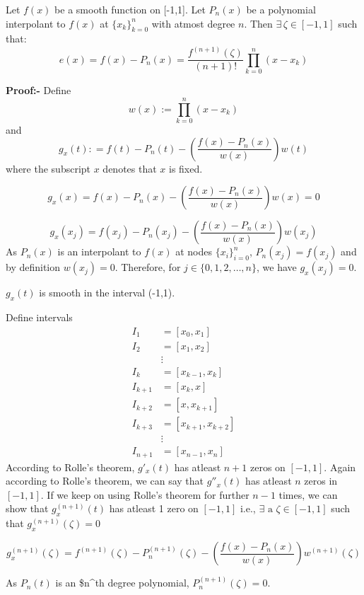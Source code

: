 \documentclass[
]{book}
\begin{document}
Let \(f(x)\) be a smooth function on {[}-1,1{]}. Let \(P_n(x)\) be a polynomial interpolant to \(f(x)\) at \(\{x_k\}_{k=0}^n\) with atmost degree \(n\). Then \(\exists \, \zeta\in[-1,1]\) such that:
\begin{equation}
e(x) = f(x)-P_n(x) = \frac{f^{(n+1)}(\zeta)}{(n+1)!}\prod_{k=0}^n(x-x_k)
\end{equation}

\textbf{Proof:-}
Define \[w(x) := \prod_{k=0}^n(x-x_k)\] and
\begin{equation}
g_x(t) : = f(t)-P_n(t)-\left(\frac{f(x)-P_n(x)}{w(x)}\right)w(t)
\end{equation}
where the subscript \(x\) denotes that \(x\) is fixed.

\[g_x(x) = f(x)-P_n(x)-\left(\frac{f(x)-P_n(x)}{w(x)}\right)w(x) = 0\]

\[g_x(x_j) = f(x_j)-P_n(x_j)-\left(\frac{f(x)-P_n(x)}{w(x)}\right)w(x_j)\]
As \(P_n(x)\) is an interpolant to \(f(x)\) at nodes \(\{x_i\}_{i=0}^n\), \(P_n(x_j) = f(x_j)\) and by definition \(w(x_j) =0\). Therefore, for \(j\in\{0,1,2,\dots ,n\}\), we have \(g_x(x_j)=0\).

\(g_x(t)\) is smooth in the interval (-1,1).

Define intervals
\begin{align}
I_1     &= [x_0,x_1]\\
I_2     &= [x_1,x_2]\\
        &\vdots\\
I_k     &= [x_{k-1},x_k]\\
I_{k+1} &= [x_k,x]\\
I_{k+2} &=[x,x_{k+1}]\\
I_{k+3} &= [x_{k+1},x_{k+2}]\\
        &\vdots\\
I_{n+1} &= [x_{n-1},x_n]
\end{align}
According to Rolle's theorem, \(g'_x(t)\) has atleast \(n+1\) zeros on \([-1,1]\).
Again according to Rolle's theorem, we can say that \(g''_x(t)\) has atleast \(n\) zeros in \([-1,1]\). If we keep on using Rolle's theorem for further \(n-1\) times, we can show that \(g_x^{(n+1)}(t)\) has atleast 1 zero on \([-1,1]\) i.e., \(\exists \text{ a } \zeta\in[-1,1]\) such that \(g_x^{(n+1)}(\zeta)=0\)

\[g^{(n+1)}_x(\zeta) = f^{(n+1)}(\zeta)-P^{(n+1)}_n(\zeta)-\left(\frac{f(x)-P_n(x)}{w(x)}\right)w^{(n+1)}(\zeta)\]

As \(P_n(t)\) is an \$n\^{}th degree polynomial, \(P^{(n+1)}_n(\zeta)=0\).
\end{document}
